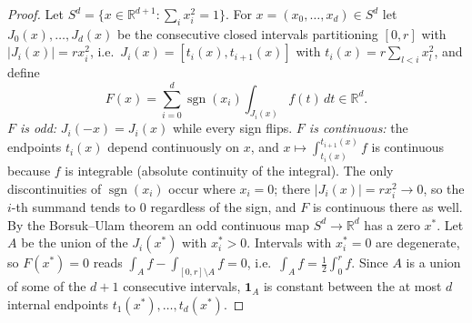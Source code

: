\documentclass[11pt,a4paper]{article}
\theoremstyle{plain}
\theoremstyle{definition}
\theoremstyle{remark}
\newcommand{\R}{\mathbb R}
\newcommand{\sgn}{\operatorname{sgn}}
\newcommand{\vone}{\mathbf 1}
\begin{document}
\label{pf:hr}
\lemhr*
\begin{proof}
Let $S^d=\{x\in\R^{d+1}:\sum_ix_i^2=1\}$. For $x=(x_0,\dots,x_d)\in S^d$ let $J_0(x),\dots,J_d(x)$ be the consecutive closed intervals partitioning $[0,r]$ with $|J_i(x)|=rx_i^2$, i.e.\ $J_i(x)=[t_{i}(x),t_{i+1}(x)]$ with $t_i(x)=r\sum_{l<i}x_l^2$, and define
\[
 F(x)=\sum_{i=0}^d\sgn(x_i)\int_{J_i(x)}f(t)\,dt\in\R^d .
\]
\emph{$F$ is odd:} $J_i(-x)=J_i(x)$ while every sign flips. \emph{$F$ is continuous:} the endpoints $t_i(x)$ depend continuously on $x$, and $x\mapsto\int_{t_i(x)}^{t_{i+1}(x)}f$ is continuous because $f$ is integrable (absolute continuity of the integral). The only discontinuities of $\sgn(x_i)$ occur where $x_i=0$; there $|J_i(x)|=rx_i^2\to0$, so the $i$-th summand tends to $0$ regardless of the sign, and $F$ is continuous there as well. By the Borsuk--Ulam theorem an odd continuous map $S^d\to\R^d$ has a zero $x^*$. Let $A$ be the union of the $J_i(x^*)$ with $x^*_i>0$. Intervals with $x_i^*=0$ are degenerate, so $F(x^*)=0$ reads $\int_Af-\int_{[0,r]\setminus A}f=0$, i.e.\ $\int_Af=\frac12\int_0^rf$. Since $A$ is a union of some of the $d+1$ consecutive intervals, $\vone_A$ is constant between the at most $d$ internal endpoints $t_1(x^*),\dots,t_d(x^*)$.
\end{proof}
\end{document}
